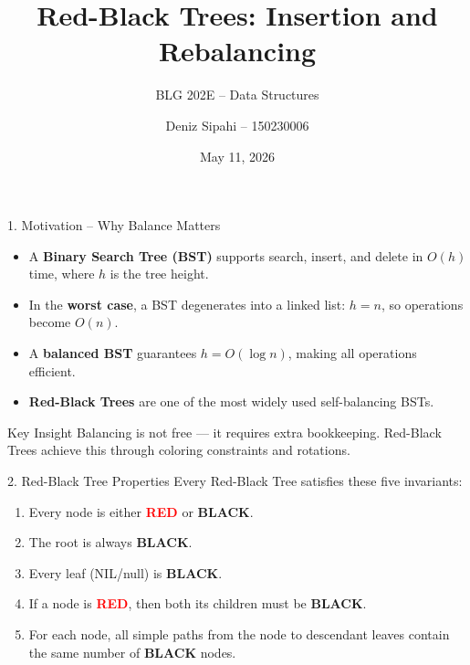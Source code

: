 \documentclass{beamer}
\title{Red-Black Trees: Insertion and Rebalancing}
\subtitle{BLG 202E -- Data Structures}
\author{Deniz Sipahi -- 150230006}
\date{May 11, 2026}
\institute{Istanbul Technical University}
\begin{document}
\begin{frame}
\titlepage
\end{frame}

\begin{frame}{1. Motivation -- Why Balance Matters}
\begin{itemize}
    \item A \textbf{Binary Search Tree (BST)} supports search, insert, and delete in $O(h)$ time, where $h$ is the tree height.
    \item In the \textbf{worst case}, a BST degenerates into a linked list: $h = n$, so operations become $O(n)$.
    \item A \textbf{balanced BST} guarantees $h = O(\log n)$, making all operations efficient.
    \item \textbf{Red-Black Trees} are one of the most widely used self-balancing BSTs.
\end{itemize}

\begin{block}{Key Insight}
Balancing is not free --- it requires extra bookkeeping. Red-Black Trees achieve this through coloring constraints and rotations.
\end{block}
\end{frame}

\begin{frame}{2. Red-Black Tree Properties}
Every Red-Black Tree satisfies these five invariants:
\begin{enumerate}
    \item Every node is either \textcolor{red}{\textbf{RED}} or \textbf{BLACK}.
    \item The root is always \textbf{BLACK}.
    \item Every leaf (NIL/null) is \textbf{BLACK}.
    \item If a node is \textcolor{red}{\textbf{RED}}, then both its children must be \textbf{BLACK}.
    \item For each node, all simple paths from the node to descendant leaves contain the same number of \textbf{BLACK} nodes.
\end{enumerate}
\end{frame}
\end{document}
